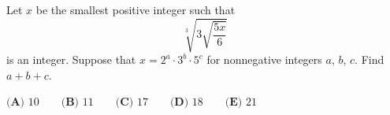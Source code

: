 Let $x$ be the smallest positive integer such that
\[\sqrt[3]{3\sqrt{\dfrac{5x}{6}}}\]
is an integer. Suppose that $x=2^a\cdot3^b\cdot5^c$ for nonnegative integers $a$, $b$, $c$. Find $a+b+c$.

$\textbf{(A) }10\qquad\textbf{(B) }11\qquad\textbf{(C) }17\qquad\textbf{(D) }18\qquad\textbf{(E) }21$
